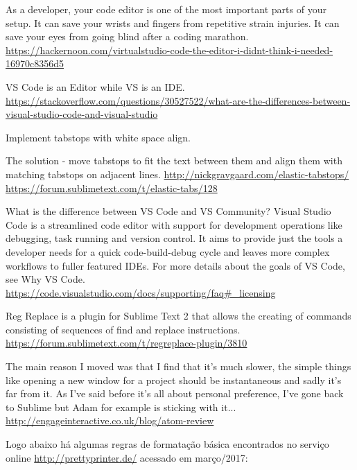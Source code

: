 \begin{englishtext}
    As a developer, your code editor is one of the most important parts of your setup. It can save
    your wrists and fingers from repetitive strain injuries. It can save your eyes from going blind
    after a coding marathon.
    \url{https://hackernoon.com/virtualstudio-code-the-editor-i-didnt-think-i-needed-16970c8356d5}

    VS Code is an Editor while VS is an IDE.
    \url{https://stackoverflow.com/questions/30527522/what-are-the-differences-between-visual-studio-code-and-visual-studio}

    Implement tabstops with white space align.

    The solution - move tabstops to fit the text between them and align them with matching tabstops
    on adjacent lines.
    \url{http://nickgravgaard.com/elastic-tabstops/}
    \url{https://forum.sublimetext.com/t/elastic-tabs/128}

    What is the difference between VS Code and VS Community?
    Visual Studio Code is a streamlined code editor with support for development operations like
    debugging, task running and version control. It aims to provide just the tools a developer needs
    for a quick code-build-debug cycle and leaves more complex workflows to fuller featured IDEs.
    For more details about the goals of VS Code, see Why VS Code.
    \url{https://code.visualstudio.com/docs/supporting/faq#_licensing}

    Reg Replace is a plugin for Sublime Text 2 that allows the creating of commands consisting of
    sequences of find and replace instructions.
    \url{https://forum.sublimetext.com/t/regreplace-plugin/3810}

    The main reason I moved was that I find that it’s much slower, the simple things like opening a
    new window for a project should be instantaneous and sadly it’s far from it. As I've said before
    it's all about personal preference, I've gone back to Sublime but Adam for example is sticking
    with it...
    \url{http://engageinteractive.co.uk/blog/atom-review}

    Logo abaixo há algumas regras de formatação básica encontrados no serviço online
    \url{http://prettyprinter.de/} acessado em março/2017:


\end{englishtext}
